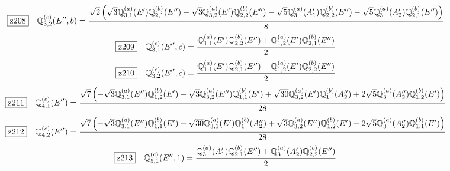 \documentclass[fleqn,10pt,landscape]{jsarticle}
\begin{document}
\begin{dmath*}
\hspace*{3mm}\fbox{z208}\quad \mathbb{Q}_{3,2}^{(c)}(E^{\prime\prime},b)=\frac{\sqrt{2} \left(\sqrt{3} \mathbb{Q}_{3,1}^{(a)}(E^{\prime}) \mathbb{Q}_{2,1}^{(b)}(E^{\prime\prime}) - \sqrt{3} \mathbb{Q}_{3,2}^{(a)}(E^{\prime}) \mathbb{Q}_{2,2}^{(b)}(E^{\prime\prime}) - \sqrt{5} \mathbb{Q}_{3}^{(a)}(A_{1}^{\prime}) \mathbb{Q}_{2,2}^{(b)}(E^{\prime\prime}) - \sqrt{5} \mathbb{Q}_{3}^{(a)}(A_{2}^{\prime}) \mathbb{Q}_{2,1}^{(b)}(E^{\prime\prime})\right)}{8}
\end{dmath*}
\begin{dmath*}
\hspace*{3mm}\fbox{z209}\quad \mathbb{Q}_{3,1}^{(c)}(E^{\prime\prime},c)=\frac{\mathbb{Q}_{1,1}^{(a)}(E^{\prime}) \mathbb{Q}_{2,2}^{(b)}(E^{\prime\prime}) + \mathbb{Q}_{1,2}^{(a)}(E^{\prime}) \mathbb{Q}_{2,1}^{(b)}(E^{\prime\prime})}{2}
\end{dmath*}
\begin{dmath*}
\hspace*{3mm}\fbox{z210}\quad \mathbb{Q}_{3,2}^{(c)}(E^{\prime\prime},c)=\frac{\mathbb{Q}_{1,1}^{(a)}(E^{\prime}) \mathbb{Q}_{2,1}^{(b)}(E^{\prime\prime}) - \mathbb{Q}_{1,2}^{(a)}(E^{\prime}) \mathbb{Q}_{2,2}^{(b)}(E^{\prime\prime})}{2}
\end{dmath*}
\begin{dmath*}
\hspace*{3mm}\fbox{z211}\quad \mathbb{Q}_{4,1}^{(c)}(E^{\prime\prime})=\frac{\sqrt{7} \left(- \sqrt{3} \mathbb{Q}_{3,1}^{(a)}(E^{\prime\prime}) \mathbb{Q}_{1,2}^{(b)}(E^{\prime}) - \sqrt{3} \mathbb{Q}_{3,2}^{(a)}(E^{\prime\prime}) \mathbb{Q}_{1,1}^{(b)}(E^{\prime}) + \sqrt{30} \mathbb{Q}_{3,2}^{(a)}(E^{\prime}) \mathbb{Q}_{1}^{(b)}(A_{2}^{\prime\prime}) + 2 \sqrt{5} \mathbb{Q}_{3}^{(a)}(A_{2}^{\prime\prime}) \mathbb{Q}_{1,2}^{(b)}(E^{\prime})\right)}{28}
\end{dmath*}
\begin{dmath*}
\hspace*{3mm}\fbox{z212}\quad \mathbb{Q}_{4,2}^{(c)}(E^{\prime\prime})=\frac{\sqrt{7} \left(- \sqrt{3} \mathbb{Q}_{3,1}^{(a)}(E^{\prime\prime}) \mathbb{Q}_{1,1}^{(b)}(E^{\prime}) - \sqrt{30} \mathbb{Q}_{3,1}^{(a)}(E^{\prime}) \mathbb{Q}_{1}^{(b)}(A_{2}^{\prime\prime}) + \sqrt{3} \mathbb{Q}_{3,2}^{(a)}(E^{\prime\prime}) \mathbb{Q}_{1,2}^{(b)}(E^{\prime}) - 2 \sqrt{5} \mathbb{Q}_{3}^{(a)}(A_{2}^{\prime\prime}) \mathbb{Q}_{1,1}^{(b)}(E^{\prime})\right)}{28}
\end{dmath*}
\begin{dmath*}
\hspace*{3mm}\fbox{z213}\quad \mathbb{Q}_{5,1}^{(c)}(E^{\prime\prime},1)=\frac{\mathbb{Q}_{3}^{(a)}(A_{1}^{\prime}) \mathbb{Q}_{2,1}^{(b)}(E^{\prime\prime}) + \mathbb{Q}_{3}^{(a)}(A_{2}^{\prime}) \mathbb{Q}_{2,2}^{(b)}(E^{\prime\prime})}{2}
\end{dmath*}
\end{document}
